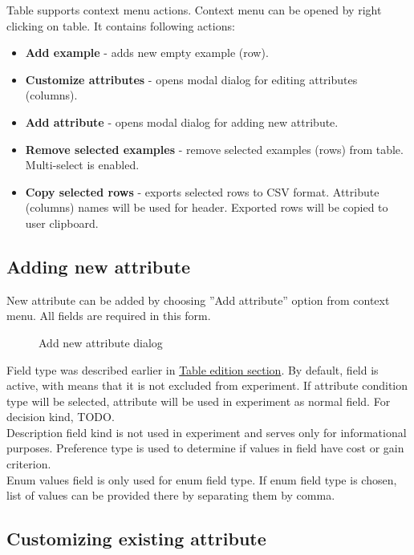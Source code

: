 Table supports context menu actions. Context menu can be opened by right clicking on table. It contains following actions:
\begin{itemize}
	\item \textbf{Add example} - adds new empty example (row).
	\item \textbf{Customize attributes} - opens modal dialog for editing attributes (columns).
	\item \textbf{Add attribute} - opens modal dialog for adding new attribute.
	\item \textbf{Remove selected examples} - remove selected examples (rows) from table. Multi-select is enabled.
	\item \textbf{Copy selected rows} - exports selected rows to CSV format. Attribute (columns) names will be used for header. Exported rows will be copied to user clipboard.
\end{itemize}

\subsection{Adding new attribute}\label{sub:isf-add-attr}

New attribute can be added by choosing ''Add attribute'' option from context menu. All fields are required in this form.

\begin{figure*}[!ht] 
	\centering
	\caption{Add new attribute dialog}
\end{figure*}

Field type was described earlier in \hyperref[sub:isf-examples]{Table edition section}. By default, field is active, with means that it is not excluded from experiment.
If attribute condition type will be selected, attribute will be used in experiment as normal field. For decision kind, TODO.\\ Description field kind is not used in experiment and serves only for informational purposes. Preference type is used to determine if values in field have cost or gain criterion.\\
Enum values field is only used for enum field type. If enum field type is chosen, list of values can be provided there by separating them by comma.

\subsection{Customizing existing attribute}\label{sub:isf-cust-attr}

